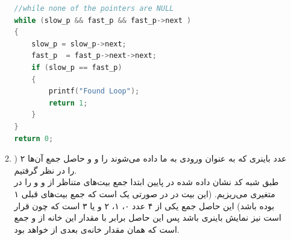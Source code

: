 \documentclass{article}
\begin{document}
\begin{enumerate}
\begin{enumerate}
\begin{latin}
\begin{flushright}
\begin{lstlisting}[language=C++]
//while none of the pointers are NULL  
while (slow_p && fast_p && fast_p->next )
{
    slow_p = slow_p->next;
    fast_p  = fast_p->next->next;
    if (slow_p == fast_p)
    {
        printf("Found Loop");
        return 1;
    }
}
return 0;
\end{lstlisting}
\end{flushright}								
\end{latin}
\item) ۲ عدد باینری که به عنوان ورودی به ما داده‌ می‌شوند را  و  و حاصل جمع آن‌ها را  در نظر گرفتیم. \\ 
طبق شبه کد نشان داده شده در پایین ابتدا جمع بیت‌های متناظر از  و  و  را در متغیری می‌ریزیم. (این بیت در  در صورتی یک است که  جمع بیت‌‌های قبلی ۱ بوده باشد) این حاصل جمع یکی از ۴ عدد ۰، ۱، ۲‌ و یا ۳ است که چون قرار است  نیز نمایش باینری باشد پس این حاصل برابر با مقدار این خانه از  و  جمع است که همان مقدار خانه‌ی بعدی از  خواهد بود. 
\begin{latin}
\begin{flushright}				
\begin{lstlisting}[language=C++]


\end{lstlisting}
\end{flushright}
\end{latin}
\end{enumerate}
\end{enumerate}
\end{document}
